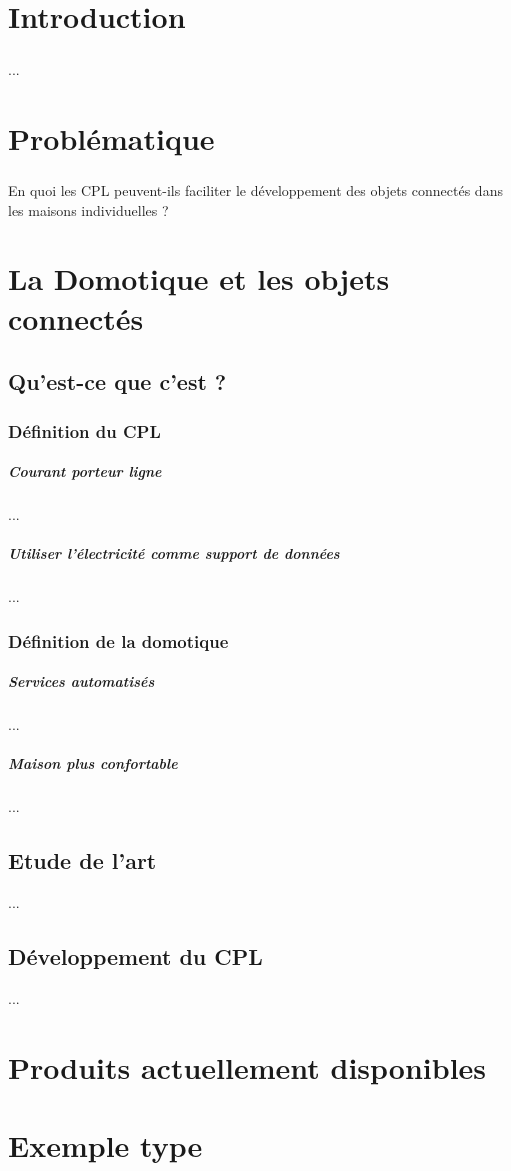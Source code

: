 
\chapter*{Introduction}
    \paragraph{}
        ...


\chapter*{Problématique}
    \paragraph{}
        En quoi les CPL peuvent-ils faciliter le développement des objets connectés dans les maisons individuelles ?



\chapter{La Domotique et les objets connectés}
    \section{Qu’est-ce que c’est ?}
        \subsection{Définition du CPL}
            \paragraph{Courant porteur ligne}
                ...
            \paragraph{Utiliser l’électricité comme support de données}
                ...
        \subsection{Définition de la domotique}
            \paragraph{Services automatisés}
                ...
            \paragraph{Maison plus confortable}
                ...
    \section{Etude de l’art}
        ...
    \section{Développement du CPL}
        ...

\chapter{Produits actuellement disponibles}

\chapter{Exemple type}
